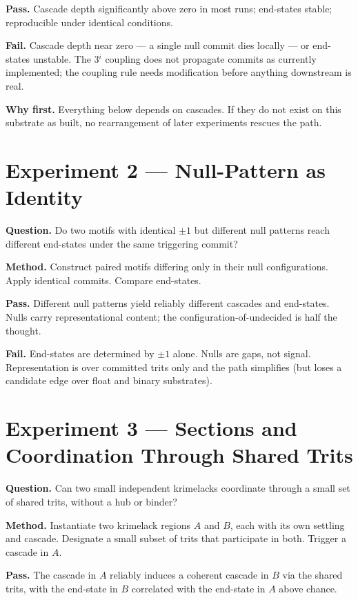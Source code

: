\documentclass[11pt]{article}
\begin{document}
\textbf{Pass.} Cascade depth significantly above zero in most runs;
end-states stable; reproducible under identical conditions.

\textbf{Fail.} Cascade depth near zero --- a single null commit dies
locally --- or end-states unstable. The 3$^i$ coupling does not
propagate commits as currently implemented; the coupling rule needs
modification before anything downstream is real.

\textbf{Why first.} Everything below depends on cascades. If
they do not exist on this substrate as built, no rearrangement of
later experiments rescues the path.

\section{Experiment 2 --- Null-Pattern as Identity}

\textbf{Question.} Do two motifs with identical $\pm 1$ but different
null patterns reach different end-states under the same triggering
commit?

\textbf{Method.} Construct paired motifs differing only in their null
configurations. Apply identical commits. Compare end-states.

\textbf{Pass.} Different null patterns yield reliably different
cascades and end-states. Nulls carry representational content; the
configuration-of-undecided is half the thought.

\textbf{Fail.} End-states are determined by $\pm 1$ alone. Nulls are
gaps, not signal. Representation is over committed trits only and the
path simplifies (but loses a candidate edge over float and binary
substrates).

\section{Experiment 3 --- Sections and Coordination Through Shared Trits}

\textbf{Question.} Can two small independent krimelacks coordinate
through a small set of shared trits, without a hub or binder?

\textbf{Method.} Instantiate two krimelack regions $A$ and $B$, each
with its own settling and cascade. Designate a small subset of
trits that participate in both. Trigger a cascade in $A$.

\textbf{Pass.} The cascade in $A$ reliably induces a coherent
cascade in $B$ via the shared trits, with the end-state in $B$
correlated with the end-state in $A$ above chance.
\end{document}
